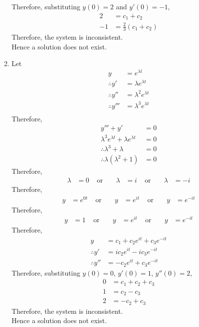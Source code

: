 \documentclass[fleqn, a4paper, 11pt, oneside]{amsart}
\theoremstyle{definition}
\theoremstyle{theorem}
\begin{document}
\begin{solution}
\begin{enumerate}[leftmargin = *]
			Therefore, substituting $y(0) = 2$ and $y'(0) = -1$,
			\begin{align*}
				2 &= c_1 + c_2\\
				-1 &= \frac{2}{3} (c_1 + c_2)
			\end{align*}
			Therefore, the system is inconsistent.\\
			Hence a solution does not exist.
		\item
			Let
			\begin{align*}
				y               & = e^{\lambda t}           \\
				\therefore y'   & = \lambda e^{\lambda t}   \\
				\therefore y''  & = \lambda^2 e^{\lambda t} \\
				\therefore y''' & = \lambda^3 e^{\lambda t} \\
			\end{align*}
			Therefore,
			\begin{align*}
				y''' + y'                                       & = 0 \\
				\lambda^3 e^{\lambda t} + \lambda e^{\lambda t} & = 0 \\
				\therefore \lambda^3 + \lambda                  & = 0 \\
				\therefore \lambda (\lambda^2 + 1)              & = 0
			\end{align*}
			Therefore,
			\begin{align*}
				\lambda & = 0 & \text{ or } &  & \lambda & = i & \text{ or } &  & \lambda & = -i
			\end{align*}
			Therefore,
			\begin{align*}
				y & = e^{0 t} & \text{ or } &  & y & = e^{i t} & \text{ or } &  & y & = e^{-i t}
			\end{align*}
			Therefore,
			\begin{align*}
				y & = 1 & \text{ or } &  & y & = e^{i t} & \text{ or } &  & y & = e^{-i t}
			\end{align*}
			Therefore,
			\begin{align*}
				y &= c_1 + c_2 e^{i t} + c_3 e^{-i t}\\
				\therefore y' &= i c_2 e^{i t} - i c_3 e^{-i t}\\
				\therefore y'' &= -c_2 e^{i t} + c_3 e^{-i t}
			\end{align*}
			Therefore, substituting $y(0) = 0$, $y'(0) = 1$, $y''(0) = 2$,
			\begin{align*}
				0 &= c_1 + c_2 + c_3\\
				1 &= c_2 - c_3\\
				2 &= -c_2 + c_3
			\end{align*}
			Therefore, the system is inconsistent.\\
			Hence a solution does not exist.
	\end{enumerate}
\end{solution}
\end{document}
